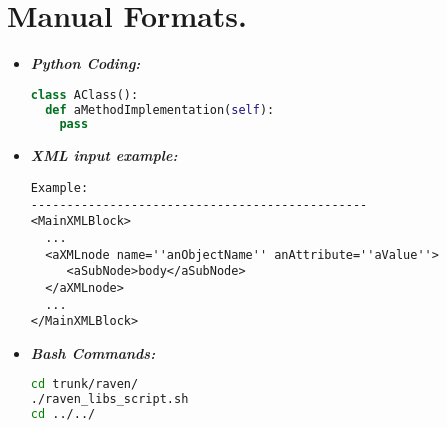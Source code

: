 \section{Manual Formats.}
\begin{itemize}
\item \textbf{\textit{Python Coding:}}
\begin{lstlisting}[language=python]
class AClass():
  def aMethodImplementation(self):
    pass
\end{lstlisting}
\item \textbf{\textit{XML input example:}}
\begin{lstlisting}[style=XML]
Example:
-----------------------------------------------
<MainXMLBlock>
  ...
  <aXMLnode name=''anObjectName'' anAttribute=''aValue''>
     <aSubNode>body</aSubNode>
  </aXMLnode>
  ...
</MainXMLBlock>
\end{lstlisting}
\item \textbf{\textit{Bash Commands:}}
\begin{lstlisting}[language=bash]
cd trunk/raven/
./raven_libs_script.sh
cd ../../
\end{lstlisting}
\end{itemize}
 
